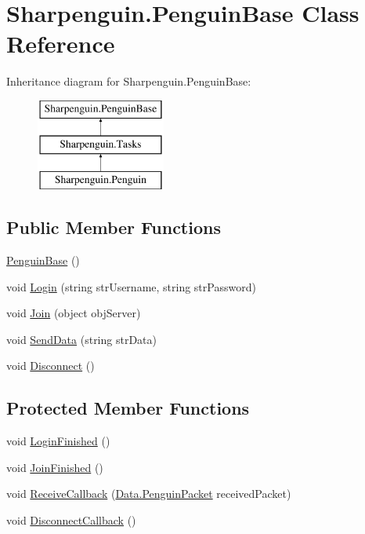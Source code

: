 \hypertarget{classSharpenguin_1_1PenguinBase}{\section{\-Sharpenguin.\-Penguin\-Base \-Class \-Reference}
\label{classSharpenguin_1_1PenguinBase}
}
\-Inheritance diagram for \-Sharpenguin.\-Penguin\-Base\-:\begin{figure}[H]
\begin{center}
\leavevmode
\includegraphics[height=3.000000cm]{classSharpenguin_1_1PenguinBase}
\end{center}
\end{figure}
\subsection*{\-Public \-Member \-Functions}
\begin{DoxyCompactItemize}
\item 
\hyperlink{classSharpenguin_1_1PenguinBase_abae69c0be10d8de6f6f852a5a9820c44}{\-Penguin\-Base} ()
\item 
void \hyperlink{classSharpenguin_1_1PenguinBase_a339081cc6d7b689525639e9c41275d53}{\-Login} (string str\-Username, string str\-Password)
\item 
void \hyperlink{classSharpenguin_1_1PenguinBase_ae883a098b18a513c9ca47e80d833c32e}{\-Join} (object obj\-Server)
\item 
void \hyperlink{classSharpenguin_1_1PenguinBase_a50ba7c1e17673282b539e280c4552773}{\-Send\-Data} (string str\-Data)
\item 
void \hyperlink{classSharpenguin_1_1PenguinBase_a1c56da96688962cc6db870fad34b9e62}{\-Disconnect} ()
\end{DoxyCompactItemize}
\subsection*{\-Protected \-Member \-Functions}
\begin{DoxyCompactItemize}
\item 
void \hyperlink{classSharpenguin_1_1PenguinBase_aa6a126810f26f0b1d85b8c6e35eed5c9}{\-Login\-Finished} ()
\item 
void \hyperlink{classSharpenguin_1_1PenguinBase_a64a4a3cd550fd49156f9ed5fbd1836ed}{\-Join\-Finished} ()
\item 
void \hyperlink{classSharpenguin_1_1PenguinBase_a0d866e6fe167c36721fc282cb36d9d07}{\-Receive\-Callback} (\hyperlink{classSharpenguin_1_1Data_1_1PenguinPacket}{\-Data.\-Penguin\-Packet} received\-Packet)
\item 
void \hyperlink{classSharpenguin_1_1PenguinBase_a06facd0f0f753fa79596ae31a6811a86}{\-Disconnect\-Callback} ()
\end{DoxyCompactItemize}
